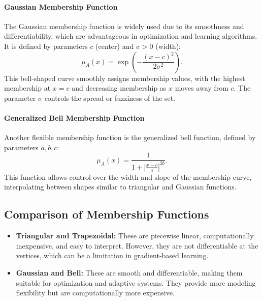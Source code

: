 \paragraph{Gaussian Membership Function}

The Gaussian membership function is widely used due to its smoothness and differentiability, which are advantageous in optimization and learning algorithms. It is defined by parameters \(c\) (center) and \(\sigma > 0\) (width):
\begin{equation}
\mu_A(x) = \exp\left(-\frac{(x - c)^2}{2\sigma^2}\right).
\label{eq:gaussian-mf}
\end{equation}
This bell-shaped curve smoothly assigns membership values, with the highest membership at \(x = c\) and decreasing membership as \(x\) moves away from \(c\). The parameter \(\sigma\) controls the spread or fuzziness of the set.

\paragraph{Generalized Bell Membership Function}

Another flexible membership function is the generalized bell function, defined by parameters \(a, b, c\):
\begin{equation}
\mu_A(x) = \frac{1}{1 + \left|\frac{x - c}{a}\right|^{2b}}.
\label{eq:bell-mf}
\end{equation}
This function allows control over the width and slope of the membership curve, interpolating between shapes similar to triangular and Gaussian functions.

\subsection{Comparison of Membership Functions}
\label{sec:fuzzysets_comparison_of_membership_functions}

\begin{itemize}
    \item \textbf{Triangular and Trapezoidal:} These are piecewise linear, computationally inexpensive, and easy to interpret. However, they are not differentiable at the vertices, which can be a limitation in gradient-based learning.
    \item \textbf{Gaussian and Bell:} These are smooth and differentiable, making them suitable for optimization and adaptive systems. They provide more modeling flexibility but are computationally more expensive.
\end{itemize}


